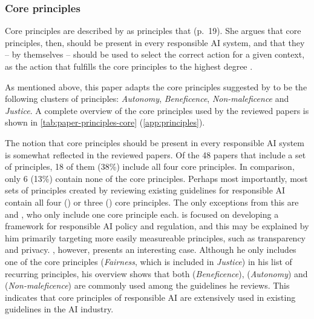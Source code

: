 \subsubsection{Core principles}
Core principles are described by \textcite{Canca_2020} as principles that  (p.~19). She argues that core principles, then, should be present in every responsible AI system, and that they -- by themselves -- should be used to select the correct action for a given context, as the action that fulfills the core principles to the highest degree \parencite{Canca_2020}.

As mentioned above, this paper adapts the core principles suggested by \textcite{Canca_2020} to be the following clusters of principles: \textit{Autonomy}, \textit{Beneficence}, \textit{Non-maleficence} and \textit{Justice}. A complete overview of the core principles used by the reviewed papers is shown in \autoref{tab:paper-principles-core} (\autoref{app:principles}).

The notion that core principles should be present in every responsible AI system is somewhat reflected in the reviewed papers. Of the 48 papers that include a set of principles, 18 of them (38\%) include all four core principles. In comparison, only 6 (13\%) contain none of the core principles. Perhaps most importantly, most sets of principles created by reviewing existing guidelines for responsible AI contain all four (\cite{Clarke_2019,Floridi_2018,Jobin_2019,Ryan_2021}) or three (\cite{Fjeld_2020}) core principles. The only exceptions from this are \textcite{Brand_2022} and \textcite{Hagendorff_2020}, who only include one core principle each. \textcite{Brand_2022} is focused on developing a framework for responsible AI policy and regulation, and this may be explained by him primarily targeting more easily measureable principles, such as transparency and privacy. \textcite{Hagendorff_2020}, however, presents an interesting case. Although he only includes one of the core principles (\textit{Fairness}, which is included in \textit{Justice}) in his list of recurring principles, his overview \parencite[Table 1]{Hagendorff_2020} shows that both  (\textit{Beneficence}),  (\textit{Autonomy}) and  (\textit{Non-maleficence}) are commonly used among the guidelines he reviews. This indicates that core principles of responsible AI are extensively used in existing guidelines in the AI industry. 

